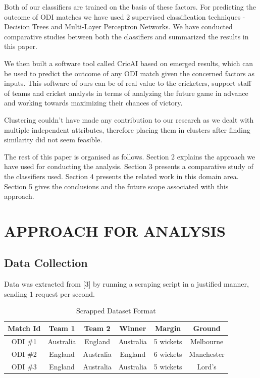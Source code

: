 \documentclass[a4paper, 10pt, conference]{IEEEtran}
\begin{document}
Both of our classifiers are trained on the basis of these factors. For predicting the outcome of ODI matches we have used 2 supervised classification techniques - Decision Trees and Multi-Layer Perceptron Networks. We have conducted comparative studies between both the classifiers and summarized the results in this paper. 

We then built a software tool called CricAI based on emerged results, which can be used to predict the outcome of any ODI match given the concerned factors as inputs. This software of ours can be of real value to the cricketers, support staff of teams and cricket analysts in terms of analyzing the future game in advance and working towards maximizing their chances of victory.

Clustering couldn't have made any contribution to our research as we dealt with multiple independent attributes, therefore placing them in clusters after finding similarity did not seem feasible. 

The rest of this paper is organised as follows. Section 2 explains the approach we have used for conducting the analysis. Section 3 presents a comparative study of the classifiers used. Section 4 presents the related work in this domain area. Section 5 gives the conclusions and the future scope associated with this approach. \\

\section{APPROACH FOR ANALYSIS}

\subsection{Data Collection}

Data was extracted from [3] by running a scraping script in a justified manner, sending 1 request per second.
\begin{table}[h!]
  \begin{center}
    \caption{Scrapped Dataset Format}
    \label{tab:table1}
    \begin{tabular}{cccccc} 
      \textbf{Match Id} & \textbf{Team 1} & \textbf{Team 2} & \textbf{Winner} & \textbf{Margin} & \textbf{Ground}\\
      \hline
      ODI \#1 & Australia & England & Australia & 5 wickets & Melbourne\\
      ODI \#2 & England & Australia & England & 6 wickets & Manchester\\
      ODI \#3 & England & Australia & Australia & 5 wickets & Lord's\\
    \end{tabular}
  \end{center}
\end{table}
\end{document}
